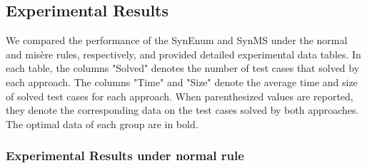 \documentclass[review]{elsarticle}
\begin{document}
\subsection{Experimental Results}
We compared the performance of the SynEnum and SynMS under the normal and mis\`{e}re rules, respectively, and provided detailed experimental data tables. In each table,
the columns "Solved" denotes the number of test cases that solved by each approach.
The columns "Time" and "Size" denote the average time and size of solved test cases for each approach.
When parenthesized values are reported, they denote the corresponding data on the test cases solved by both approaches.
The optimal data of each group are in bold.

\subsubsection{Experimental Results under normal rule}
\end{document}
